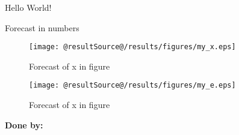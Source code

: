 \documentclass[10pt,letterpaper]{article}
\begin{document}
Hello World!
\begin{table}[!ht]
  \caption{Forecast in numbers}
  \begin{center}
      
  \end{center}
\end{table}

\begin{figure}[!ht]
  \caption{Forecast of x in figure}
  \begin{center}
  	  \texttt{[image: @resultSource@/results/figures/my\_x.eps]}
  \end{center}
\end{figure}
 
\newpage
\setlength\parskip{1.8mm}

\bodytext

\begin{figure}[!ht]
  \caption{Forecast of x in figure}
  \begin{center}
  	  \texttt{[image: @resultSource@/results/figures/my\_e.eps]}
  \end{center}
\end{figure}

{\bf Done by: \doneby}
\end{document}
